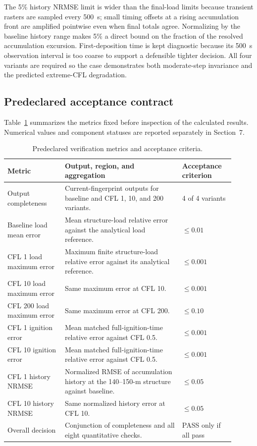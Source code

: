 The 5\% history NRMSE limit is wider than the final-load limits because
transient rasters are sampled every \SI{500}{s}; small timing offsets at a
rising accumulation front are amplified pointwise even when final totals
agree.  Normalizing by the baseline history range makes 5\% a direct bound on
the fraction of the resolved accumulation excursion.  First-deposition time is
kept diagnostic because its \SI{500}{s} observation interval is too coarse to
support a defensible tighter decision.  All four variants are required so the
case demonstrates both moderate-step invariance and the predicted extreme-CFL
degradation.

\subsection{Predeclared acceptance contract}

Table~\ref{tab:acceptance-contract} summarizes the metrics fixed before
inspection of the calculated results. Numerical values and component statuses
are reported separately in Section~7.

\begin{table}[H]
\centering
\footnotesize
\caption{Predeclared verification metrics and acceptance criteria.}
\label{tab:acceptance-contract}
\begin{tabular}{@{}p{0.23\linewidth}p{0.47\linewidth}p{0.21\linewidth}@{}}
\toprule
Metric & Output, region, and aggregation & Acceptance criterion\\
\midrule
Output completeness & Current-fingerprint outputs for baseline and CFL 1, 10, and 200 variants. & 4 of 4 variants \\
Baseline load mean error & Mean structure-load relative error against the analytical load reference. & \(\le0.01\) \\
CFL 1 load maximum error & Maximum finite structure-load relative error against its analytical reference. & \(\le0.001\) \\
CFL 10 load maximum error & Same maximum error at CFL 10. & \(\le0.001\) \\
CFL 200 load maximum error & Same maximum error at CFL 200. & \(\le0.10\) \\
CFL 1 ignition error & Mean matched full-ignition-time relative error against CFL 0.5. & \(\le0.001\) \\
CFL 10 ignition error & Mean matched full-ignition-time relative error against CFL 0.5. & \(\le0.001\) \\
CFL 1 history NRMSE & Normalized RMSE of accumulation history at the 140--150-m structure against baseline. & \(\le0.05\) \\
CFL 10 history NRMSE & Same normalized history error at CFL 10. & \(\le0.05\) \\
Overall decision & Conjunction of completeness and all eight quantitative checks. & PASS only if all pass \\
\bottomrule
\end{tabular}
\end{table}


